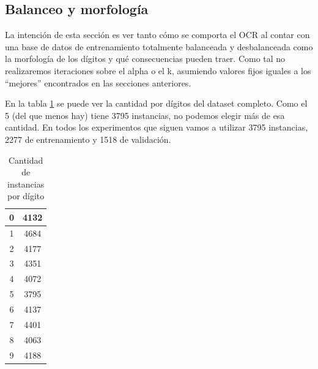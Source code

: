 \subsection{Balanceo y morfología}
La intención de esta sección es ver tanto cómo se comporta el OCR al contar con una base de datos de entrenamiento totalmente balanceada y desbalanceada como la morfología de los dígitos y qué consecuencias pueden traer. Como tal no realizaremos iteraciones sobre el alpha o el k, asumiendo valores fijos iguales a los ``mejores'' encontrados en las secciones anteriores.

En la tabla \ref{tab:totalDigitos} se puede ver la cantidad por dígitos del dataset completo. Como el 5 (del que menos hay) tiene 3795 instancias, no podemos elegir más de esa cantidad. En todos los experimentos que siguen vamos a utilizar 3795 instancias, 2277 de entrenamiento y 1518 de validación.

\begin{table}[h]
\centering
\begin{tabular}{|c|c|}
\hline
0 & 4132 \\ \hline
1 & 4684 \\ \hline
2 & 4177 \\ \hline
3 & 4351 \\ \hline
4 & 4072 \\ \hline
5 & 3795 \\ \hline
6 & 4137 \\ \hline
7 & 4401 \\ \hline
8 & 4063 \\ \hline
9 & 4188 \\ \hline
\end{tabular}
\caption{Cantidad de instancias por dígito}
\label{tab:totalDigitos}
\end{table}

